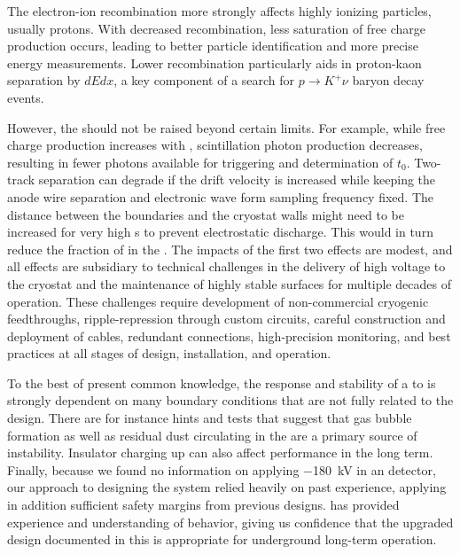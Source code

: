 The electron-ion recombination more strongly affects highly ionizing particles, usually protons.  With decreased recombination, less saturation of free charge production occurs,  leading to better particle identification and more precise energy measurements.  Lower recombination particularly aids in proton-kaon separation by $dEdx$, a key component of a search for $p\rightarrow K^+ \nu$ baryon decay events. 

However, the \efield should not be raised beyond certain limits. For example, while free charge production increases with \efield, scintillation photon production decreases, resulting in fewer photons available for triggering and determination of $t_0$. Two-track separation can degrade if the drift velocity is increased while keeping the anode wire separation and electronic wave form sampling frequency fixed. The distance between the  boundaries and the cryostat walls might  need to be increased for very high \efield{}s to prevent electrostatic discharge. This would in turn reduce the fraction of  in the . The impacts of the first two effects are modest, and all effects are subsidiary to technical challenges in the delivery of high voltage to the cryostat and the maintenance of highly stable    surfaces for multiple decades of operation. These challenges require development of non-commercial cryogenic  feedthroughs,  ripple-repression through custom   circuits, careful construction and deployment of  cables, redundant  connections, high-precision monitoring, and best practices at all stages of design, installation, and operation.


To the best of present common knowledge, the response and stability of a  to  is strongly dependent on many boundary conditions that are not fully related to the   design. There are for instance hints and tests that suggest that gas bubble formation as well as residual dust circulating in the  are a primary source of  instability. Insulator charging up can also affect  performance in the long term.  
Finally, because we found no information on applying \SI{-180}{\kV} in an  detector, our approach to designing the  system relied heavily on past experience, applying in addition sufficient safety margins from previous designs.  has provided experience and understanding of  behavior, giving us confidence that the upgraded design documented in this  is appropriate for underground long-term operation.  

